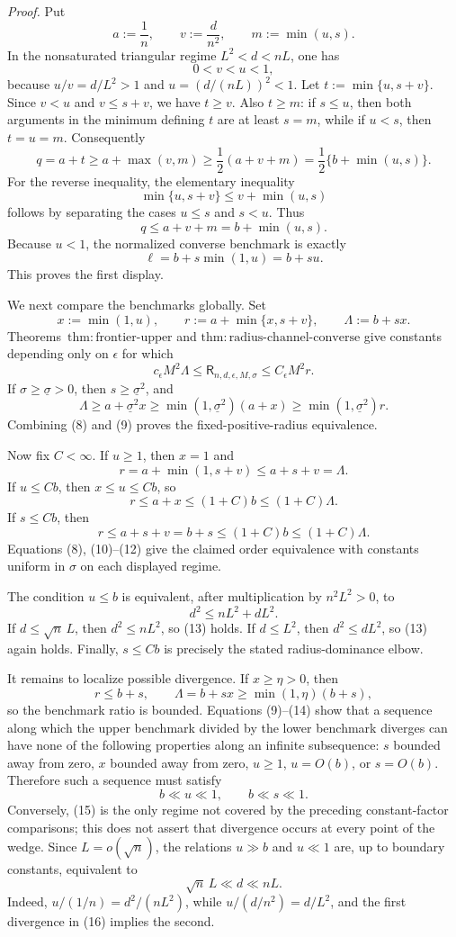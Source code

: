 \textit{Proof.}
Put
\[
 a:=\frac1n,\qquad v:=\frac d{n^2},\qquad
 m:=\min(u,s).
\tag{1}
\]
In the nonsaturated triangular regime \(L^2<d<nL\), one has
\[
 0<v<u<1,
\tag{2}
\]
because \(u/v=d/L^2>1\) and \(u=(d/(nL))^2<1\).  Let \(t:=\min\{u,s+v\}\).  Since \(v<u\) and \(v\le s+v\), we have \(t\ge v\).  Also \(t\ge m\): if \(s\le u\), then both arguments in the minimum defining \(t\) are at least \(s=m\), while if \(u<s\), then \(t=u=m\).  Consequently
\[
 q=a+t\ge a+\max(v,m)
 \ge\frac12(a+v+m)=\frac12\{b+\min(u,s)\}.
\tag{3}
\]
For the reverse inequality, the elementary inequality
\[
 \min\{u,s+v\}\le v+\min(u,s)
\tag{4}
\]
follows by separating the cases \(u\le s\) and \(s<u\).  Thus
\[
 q\le a+v+m=b+\min(u,s).
\tag{5}
\]
Because \(u<1\), the normalized converse benchmark is exactly
\[
 \ell=b+s\min(1,u)=b+su.
\tag{6}
\]
This proves the first display.

We next compare the benchmarks globally.  Set
\[
 x:=\min(1,u),\qquad
 r:=a+\min\{x,s+v\},\qquad
 \Lambda:=b+sx.
\tag{7}
\]
Theorems~\(\mathrm{thm:frontier\text{-}upper}\) and \(\mathrm{thm:radius\text{-}channel\text{-}converse}\) give constants depending only on \(\epsilon\) for which
\[
 c_\epsilon M^2\Lambda
 \le\mathsf R_{n,d,\epsilon,M,\sigma}
 \le C_\epsilon M^2r.
\tag{8}
\]
If \(\sigma\ge\underline\sigma>0\), then \(s\ge\underline\sigma^2\), and
\[
 \Lambda\ge a+\underline\sigma^2x
 \ge\min(1,\underline\sigma^2)(a+x)
 \ge\min(1,\underline\sigma^2)r.
\tag{9}
\]
Combining (8) and (9) proves the fixed-positive-radius equivalence.

Now fix \(C<\infty\).  If \(u\ge1\), then \(x=1\) and
\[
 r=a+\min(1,s+v)\le a+s+v=\Lambda.
\tag{10}
\]
If \(u\le Cb\), then \(x\le u\le Cb\), so
\[
 r\le a+x\le(1+C)b\le(1+C)\Lambda.
\tag{11}
\]
If \(s\le Cb\), then
\[
 r\le a+s+v=b+s\le(1+C)b\le(1+C)\Lambda.
\tag{12}
\]
Equations (8), (10)--(12) give the claimed order equivalence with constants uniform in \(\sigma\) on each displayed regime.

The condition \(u\le b\) is equivalent, after multiplication by \(n^2L^2>0\), to
\[
 d^2\le nL^2+dL^2.
\tag{13}
\]
If \(d\le\sqrt n\,L\), then \(d^2\le nL^2\), so (13) holds.  If \(d\le L^2\), then \(d^2\le dL^2\), so (13) again holds.  Finally, \(s\le Cb\) is precisely the stated radius-dominance elbow.

It remains to localize possible divergence.  If \(x\ge\eta>0\), then
\[
 r\le b+s,
 \qquad
 \Lambda=b+sx\ge\min(1,\eta)(b+s),
\tag{14}
\]
so the benchmark ratio is bounded.  Equations (9)--(14) show that a sequence along which the upper benchmark divided by the lower benchmark diverges can have none of the following properties along an infinite subsequence: \(s\) bounded away from zero, \(x\) bounded away from zero, \(u\ge1\), \(u=O(b)\), or \(s=O(b)\).  Therefore such a sequence must satisfy
\[
 b\ll u\ll1,
 \qquad b\ll s\ll1.
\tag{15}
\]
Conversely, (15) is the only regime not covered by the preceding constant-factor comparisons; this does not assert that divergence occurs at every point of the wedge.  Since \(L=o(\sqrt n)\), the relations \(u\gg b\) and \(u\ll1\) are, up to boundary constants, equivalent to
\[
 \sqrt n\,L\ll d\ll nL.
\tag{16}
\]
Indeed, \(u/(1/n)=d^2/(nL^2)\), while \(u/(d/n^2)=d/L^2\), and the first divergence in (16) implies the second.

